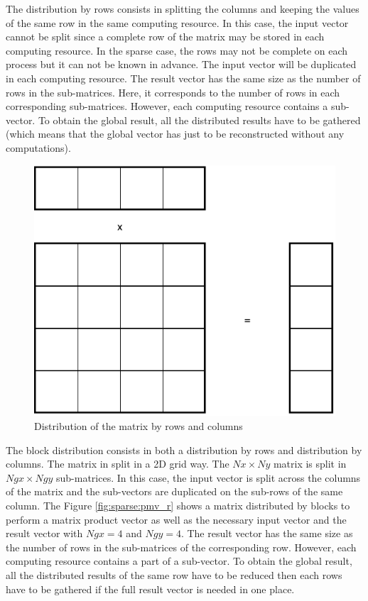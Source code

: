 The distribution by rows consists in splitting the columns and keeping the values of the same row in the same computing resource.
In this case, the input vector cannot be split since a complete row of the matrix may be stored in each computing resource.
In the sparse case, the rows may not be complete on each process but it can not be known in advance.
The input vector will be duplicated in each computing resource.
The result vector has the same size as the number of rows in the sub-matrices.
Here, it corresponds to the number of rows in each corresponding sub-matrices.
However, each computing resource contains a sub-vector.
To obtain the global result, all the distributed results have to be gathered (which means that the global vector has just to be reconstructed without any computations).


\begin{figure}[h]
	\centering
	\includegraphics[width=.5\textwidth]{pmv_2D}
	\caption{Distribution of the matrix by rows and columns\label{fig:sparse:pmv_2D}}
\end{figure}

The block distribution consists in both a distribution by rows and distribution by columns.
The matrix in split in a 2D grid way.
The $Nx \times Ny$ matrix is split in $Ngx \times Ngy$ sub-matrices.
In this case, the input vector is split across the columns of the matrix and the sub-vectors are duplicated on the sub-rows of the same column.
The Figure \ref{fig:sparse:pmv_r} shows a matrix distributed by blocks to perform a matrix product vector as well as the necessary input vector and the result vector with $Ngx = 4$ and $Ngy = 4$.
The result vector has the same size as the number of rows in the sub-matrices of the corresponding row.
However, each computing resource contains a part of a sub-vector.
To obtain the global result, all the distributed results of the same row have to be reduced then each rows have to be gathered if the full result vector is needed in one place.

